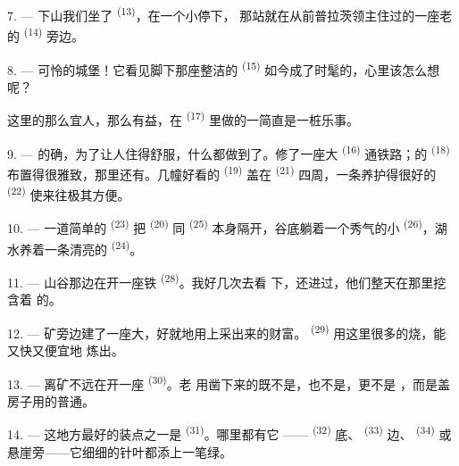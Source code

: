 7. --- 下山我们坐了 \textsuperscript{(13)}，在一个小停下，
那站就在从前普拉茨领主住过的一座老的
\textsuperscript{(14)} 旁边。

8. --- 可怜的城堡！它看见脚下那座整洁的 \textsuperscript{(15)}
如今成了时髦的，心里该怎么想呢？

这里的那么宜人，那么有益，在
\textsuperscript{(17)} 里做的一简直是一桩乐事。

\VUsaut{3.0mm}
\VUsaut{3.0mm}

9. --- 的确，为了让人住得舒服，什么都做到了。修了一座大
\textsuperscript{(16)} 通铁路；的 \textsuperscript{(18)}
布置得很雅致，那里还有。几幢好看的 \textsuperscript{(19)}
盖在 \textsuperscript{(21)} 四周，一条养护得很好的
\textsuperscript{(22)} 使来往极其方便。

10. --- 一道简单的 \textsuperscript{(23)} 把 \textsuperscript{(20)}
同 \textsuperscript{(25)} 本身隔开，谷底躺着一个秀气的小
 \textsuperscript{(26)}，湖水养着一条清亮的 \textsuperscript{(24)}。

11. --- 山谷那边在开一座铁 \textsuperscript{(28)}。我好几次去看
下，还进过，他们整天在那里挖含着
的。

12. --- 矿旁边建了一座大，好就地用上采出来的财富。
 \textsuperscript{(29)} 用这里很多的烧，能又快又便宜地
炼出。

13. --- 离矿不远在开一座 \textsuperscript{(30)}。老
用凿下来的既不是，也不是，更不是
，而是盖房子用的普通。

14. --- 这地方最好的装点之一是 \textsuperscript{(31)}。哪里都有它
—— \textsuperscript{(32)} 底、 \textsuperscript{(33)} 边、
 \textsuperscript{(34)} 或悬崖旁——它细细的针叶都添上一笔绿。

\VUsaut{3.0mm}
\VUsaut{3.0mm}

